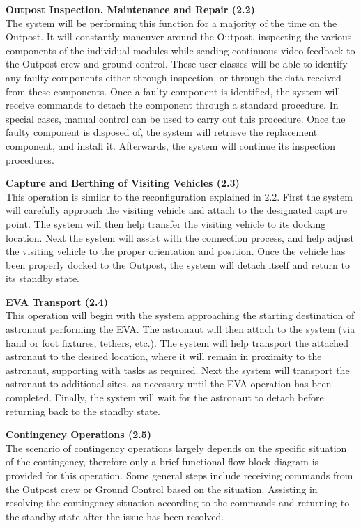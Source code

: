 \documentclass[12pt, letter]{article}
\begin{document}
\textbf{Outpost Inspection, Maintenance and Repair (2.2)}\\
The system will be performing this function for a majority of the time on the Outpost. It will constantly maneuver around the Outpost, inspecting the various components of the individual modules while sending continuous video feedback to the Outpost crew and ground control. These user classes will be able to identify any faulty components either through inspection, or through the data received from these components. Once a faulty component is identified, the system will receive commands to detach the component through a standard procedure. In special cases, manual control can be used to carry out this procedure. Once the faulty component is disposed of, the system will retrieve the replacement component, and install it. Afterwards, the system will continue its inspection procedures.

\textbf{Capture and Berthing of Visiting Vehicles (2.3)}\\
This operation is similar to the reconfiguration explained in 2.2. First the system will carefully approach the visiting vehicle and attach to the designated capture point. The system will then help transfer the visiting vehicle to its docking location. Next the system will assist with the connection process,  and help adjust the visiting vehicle to the proper orientation and position. Once the vehicle has been properly docked to the Outpost, the system will detach itself and return to its standby state.

\textbf{EVA Transport (2.4)}\\
This operation will begin with the system approaching the starting destination of astronaut performing the EVA. The astronaut will then attach to the system (via hand or foot fixtures, tethers, etc.). The system will help transport the attached astronaut to the desired location, where it will remain in proximity to the astronaut, supporting with tasks as required. Next the system will transport the astronaut to additional sites, as necessary
until the EVA operation has been completed. Finally, the system will wait for the astronaut to detach before returning back to the standby state.

\textbf{Contingency Operations (2.5)}\\
The scenario of contingency operations largely depends on the specific situation of the contingency, therefore only a brief functional flow block diagram is provided for this operation. Some general steps include receiving commands from the Outpost crew or Ground Control based on the situation. Assisting in resolving the contingency situation according to the commands and returning to the standby state after the issue has been resolved.\\
\end{document}
